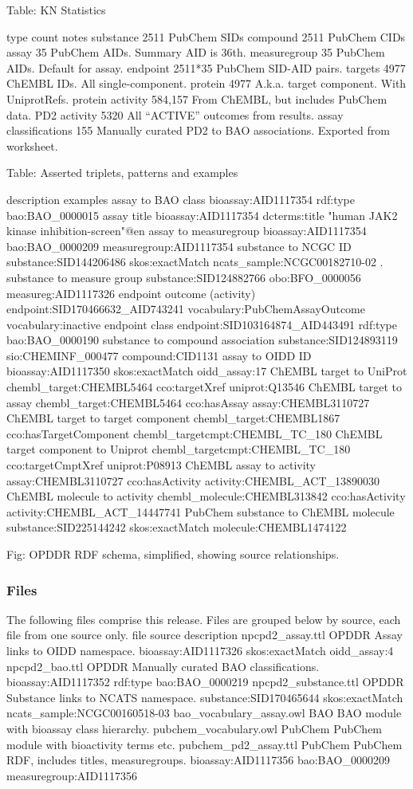 Table: KN Statistics

type
count
notes
substance
2511
PubChem SIDs
compound
2511
PubChem CIDs
assay
35
PubChem AIDs.  Summary AID is 36th.
measuregroup
35
PubChem AIDs.  Default for assay.
endpoint
2511*35
PubChem SID-AID pairs.
targets
4977
ChEMBL IDs.  All single-component.
protein
4977
A.k.a. target component.  With UniprotRefs.
protein activity
584,157
From ChEMBL, but includes PubChem data.
PD2 activity
5320
All “ACTIVE” outcomes from results.
assay classifications
155
Manually curated PD2 to BAO associations.  Exported from worksheet.

Table: Asserted triplets, patterns and examples 

description
examples
assay to BAO class
bioassay:AID1117354 rdf:type bao:BAO\_0000015
assay title
bioassay:AID1117354 dcterms:title "human JAK2 kinase inhibition-screen"@en
assay to measuregroup
bioassay:AID1117354 bao:BAO\_0000209 measuregroup:AID1117354
substance to NCGC ID
substance:SID144206486 skos:exactMatch ncats\_sample:NCGC00182710-02 .
substance to measure group
substance:SID124882766 obo:BFO\_0000056 measureg:AID1117326
endpoint outcome (activity)
endpoint:SID170466632\_AID743241 vocabulary:PubChemAssayOutcome vocabulary:inactive
endpoint class
endpoint:SID103164874\_AID443491 rdf:type bao:BAO\_0000190
substance to compound association
substance:SID124893119 sio:CHEMINF\_000477 compound:CID1131
assay to OIDD ID
bioassay:AID1117350 skos:exactMatch  oidd\_assay:17
ChEMBL target to UniProt
chembl\_target:CHEMBL5464 cco:targetXref uniprot:Q13546
ChEMBL target to assay
chembl\_target:CHEMBL5464 cco:hasAssay assay:CHEMBL3110727
ChEMBL target to target component
chembl\_target:CHEMBL1867 cco:hasTargetComponent chembl\_targetcmpt:CHEMBL\_TC\_180
ChEMBL target component to Uniprot
chembl\_targetcmpt:CHEMBL\_TC\_180 cco:targetCmptXref uniprot:P08913
ChEMBL assay to activity
assay:CHEMBL3110727 cco:hasActivity activity:CHEMBL\_ACT\_13890030
ChEMBL molecule to activity
chembl\_molecule:CHEMBL313842 cco:hasActivity activity:CHEMBL\_ACT\_14447741
PubChem substance to ChEMBL molecule
substance:SID225144242 skos:exactMatch molecule:CHEMBL1474122 

Fig: OPDDR RDF schema, simplified, showing source relationships.

\subsubsection{Files}

The following files comprise this release.  Files are grouped below by source, each file from one source only.
file
source
description
npcpd2\_assay.ttl
OPDDR
Assay links to OIDD namespace.
bioassay:AID1117326 skos:exactMatch oidd\_assay:4
npcpd2\_bao.ttl
OPDDR
Manually curated BAO classifications.
bioassay:AID1117352 rdf:type bao:BAO\_0000219
npcpd2\_substance.ttl
OPDDR
Substance links to NCATS namespace.
substance:SID170465644 skos:exactMatch ncats\_sample:NCGC00160518-03
bao\_vocabulary\_assay.owl
BAO
BAO module with bioassay class hierarchy. 
pubchem\_vocabulary.owl
PubChem
PubChem module with bioactivity terms etc.
pubchem\_pd2\_assay.ttl
PubChem
PubChem RDF, includes titles, measuregroups.
bioassay:AID1117356 bao:BAO\_0000209 measuregroup:AID1117356

